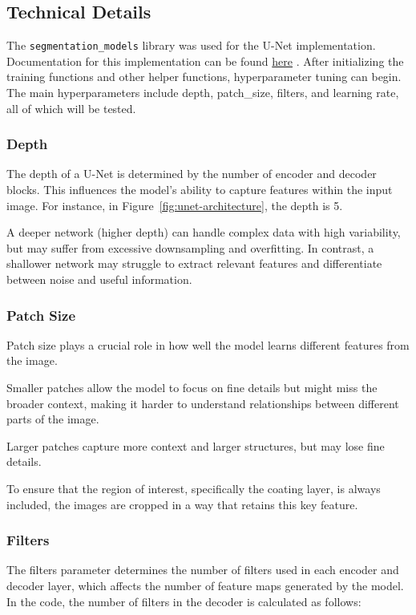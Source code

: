 \subsection{Technical Details}
The \texttt{segmentation\_models} library \cite{Iakubovskii:2019} was used for the U-Net implementation. Documentation for this implementation can be found \href{https://smp.readthedocs.io/en/latest/models.html#id22}{here} \cite{SegmentationModelsPyTorch}. After initializing the training functions and other helper functions, hyperparameter tuning can begin. The main hyperparameters include depth, patch\_size, filters, and learning rate, all of which will be tested.

\subsubsection{Depth}
The depth of a U-Net is determined by the number of encoder and decoder blocks. This influences the model's ability to capture features within the input image. For instance, in Figure~\ref{fig:unet-architecture}, the depth is 5.

A deeper network (higher depth) can handle complex data with high variability, but may suffer from excessive downsampling and overfitting. In contrast, a shallower network may struggle to extract relevant features and differentiate between noise and useful information.

\subsubsection{Patch Size}
Patch size plays a crucial role in how well the model learns different features from the image.

Smaller patches allow the model to focus on fine details but might miss the broader context, making it harder to understand relationships between different parts of the image.

Larger patches capture more context and larger structures, but may lose fine details.

To ensure that the region of interest, specifically the coating layer, is always included, the images are cropped in a way that retains this key feature.

\subsubsection{Filters}
The filters parameter determines the number of filters used in each encoder and decoder layer, which affects the number of feature maps generated by the model. In the code, the number of filters in the decoder is calculated as follows:

